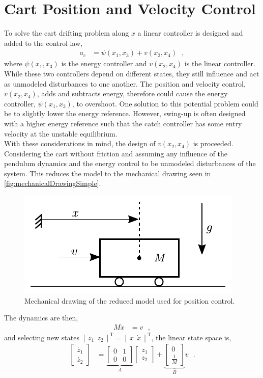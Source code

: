 \section{Cart Position and Velocity Control}
To solve the cart drifting problem along $x$ a linear controller is designed and added to the control law,
\begin{align}
  a_c &= \psi(x_1,x_3) + v(x_2,x_4) \ \ \ ,   \label{eq:combiControl} 
\end{align}
where $\psi(x_1,x_3)$ is the energy controller and $v(x_2,x_4)$ is the linear controller. While these two controllers depend on different states, they still influence and act as unmodeled disturbances to one another. The position and velocity control, $v(x_2,x_4)$, adds and subtracts energy, therefore could cause the energy controller, $\psi(x_1,x_3)$, to overshoot. One solution to this potential problem could be to slightly lower the energy reference. However, swing-up is often designed with a higher energy reference such that the catch controller has some entry velocity at the unstable equilibrium.\\
With these considerations in mind, the design of $v(x_2,x_4)$ is proceeded. Considering the cart without friction and assuming any influence of the pendulum dynamics and the energy control to be unmodeled disturbances of the system. This reduces the model to the mechanical drawing seen in \autoref{fig:mechanicalDrawingSimple}.
%
\begin{figure}[H]
  \includegraphics[width=.35\textwidth]{figures/mechanicalDrawingSimple}
  \caption{Mechanical drawing of the reduced model used for position control.}
  \label{fig:mechanicalDrawingSimple}
\end{figure}
%
The dynamics are then,
\begin{align}
  M \ddot{x} &=  v \ \ \ ,  \label{eq:simpleDynamics} 
\end{align}
and selecting new states $ [\ z_1\ \ z_2\ ]^\mathrm{T} = [\ x\ \ \dot{x}\ ]^\mathrm{T} $, the linear state space is,\vspace{6pt}
\begin{align}
  \begin{bmatrix}
    \dot{z_1} \\
    \dot{z_2}
  \end{bmatrix}
  &=
  \underbrace{
    \begin{bmatrix}
      0 & 1 \\
      0 & 0
    \end{bmatrix}
  }_{A}
  \begin{bmatrix}
    z_1 \\
    z_2
  \end{bmatrix}
  +
  \underbrace{
    \begin{bmatrix}
      0 \\
      \tfrac{1}{M}
    \end{bmatrix}
  }_{B}
  v
  \label{eq:simpleLinearStateSpace} \ \ \ .
\end{align}
